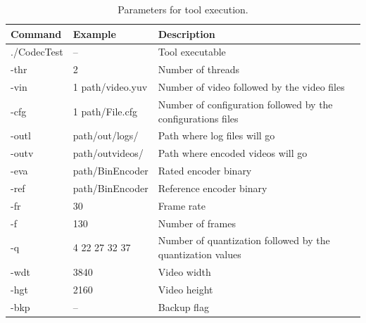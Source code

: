 \documentclass[journal]{IEEEtran}
\begin{document}
\FloatBarrier

\begin{table}[!ht]

\centering
\caption{Parameters for tool execution.}
\label{parameter_tool}
\renewcommand*{\arraystretch}{1.5}
\small
\begin{tabular}{|l|l|p{4cm}|l|}
\hline
\textbf{Command} & \textbf{Example}      & \textbf{Description}                                         \\ \hline
./CodecTest      & --                    & Tool executable                                                             \\ \hline
-thr             & 2                     & Number of threads                                            \\ \hline
-vin             & 1 path/video.yuv  & Number of video followed by the video files                  \\ \hline
-cfg             & 1 path/File.cfg & Number of configuration followed by the configurations files \\ \hline
-outl            & path/out/logs/      & Path where log files will go                                 \\ \hline
-outv            & path/outvideos/    & Path where encoded videos will go                            \\ \hline
-eva             & path/BinEncoder    & Rated encoder binary                                         \\ \hline
-ref             & path/BinEncoder    & Reference encoder binary                                     \\ \hline
-fr              & 30                    & Frame rate                                                   \\ \hline
-f               & 130                   & Number of frames                                             \\ \hline
-q             	 & 4 22 27 32 37        & Number of quantization followed by the quantization values   \\ 
\hline
-wdt             & 3840                  & Video width                                                  \\ \hline
-hgt             & 2160                  & Video height                                                 \\ \hline
-bkp             & --                    & Backup flag                                                  \\ \hline
\end{tabular}
\end{table}
\FloatBarrier
\end{document}
